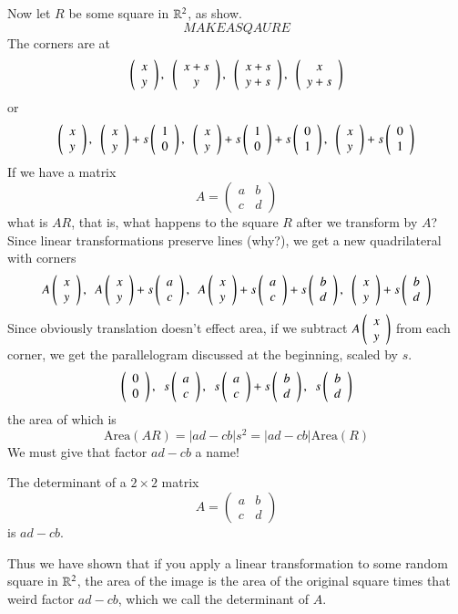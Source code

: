 Now let $R$ be some square in $\R^2$, as show.
\[MAKE A SQAURE\]
The corners are at 
\[\vect{x\\y},~~\vect{x+s\\y},~~\vect{x+s\\y+s},~~\vect{x\\y+s}\]
or
\[\vect{x\\y},~~\vect{x\\y}+s\vect{1\\0},~~\vect{x\\y}+s\vect{1\\0}+ s\vect{0\\1},~~\vect{x\\y}+s\vect{0\\1}\]
If we have a matrix
\[A=\left(\begin{array}{cc} a & b \\ c & d\end{array}\right)\]
what is $AR$, that is, what happens to the square $R$ after we transform by $A$?
Since linear transformations preserve lines (why?), we get a new quadrilateral with corners
\[A\vect{x\\y},~~A\vect{x\\y}+s\vect{a\\c},~~A\vect{x\\y}+s\vect{a\\c} + s\vect{b\\d},~~\vect{x\\y}+s\vect{b\\d}\]
Since obviously translation doesn't effect area, if we subtract $A\vect{x\\y}$ from each corner, we get the parallelogram discussed at the beginning, scaled by $s$.
\[\vect{0\\0},~~s\vect{a\\c},~~s\vect{a\\c} + s\vect{b\\d},~~s\vect{b\\d}\]
the area of which is 
\[\mbox{Area}(AR) = |ad-cb|s^2=|ad-cb|\mbox{Area}(R)\]
We must give that factor $ad-cb$ a name!
\begin{Def}
  The determinant of a $2\times 2$ matrix 
  \[A=\left(\begin{array}{cc} a & b \\ c & d\end{array}\right)\]
  is $ad-cb$.  
\end{Def}
Thus we have shown that if you apply a linear transformation to some random square in $\R^2$, the area of the image is the area of the original square times that weird factor $ad-cb$, which we call the determinant of $A$.
